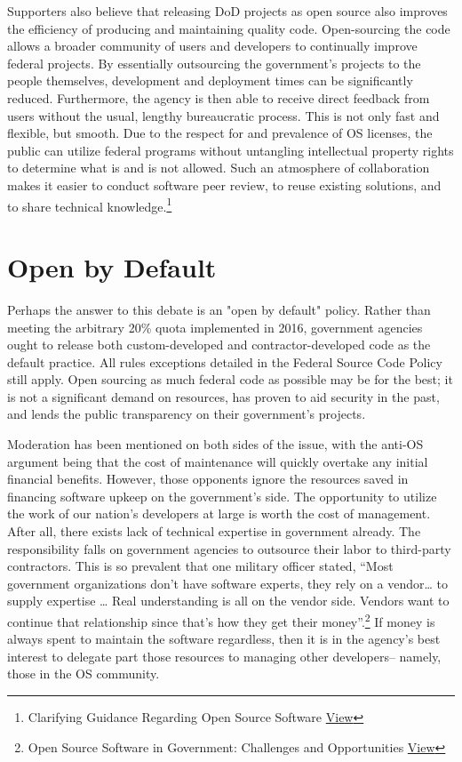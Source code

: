 \documentclass[a4paper]{article}
\begin{document}
	Supporters also believe that releasing DoD projects as open source also improves the efficiency of producing and maintaining quality code. Open-sourcing the code allows a broader community of users and developers to continually improve federal projects. By essentially outsourcing the government's projects to the people themselves, development and deployment times can be significantly reduced. Furthermore, the agency is then able to receive direct feedback from users without the usual, lengthy bureaucratic process. This is not only fast and flexible, but smooth. Due to the respect for and prevalence of OS licenses, the public can utilize federal programs without untangling intellectual property rights to determine what is and is not allowed. Such an atmosphere of collaboration makes it easier to conduct software peer review, to reuse existing solutions, and to share technical knowledge.\footnote{Clarifying Guidance Regarding Open Source Software \href{http://dodcio.defense.gov/Portals/0/Documents/OSSFAQ/2009OSS.pdf}{View}}


\section*{Open by Default}

\qquad Perhaps the answer to this debate is an "open by default" policy. Rather than meeting the arbitrary 20\% quota implemented in 2016, government agencies ought to release both custom-developed and contractor-developed code as the default practice. All rules exceptions detailed in the Federal Source Code Policy still apply. Open sourcing as much federal code as possible may be for the best; it is not a significant demand on resources, has proven to aid security in the past, and lends the public transparency on their government's projects.


Moderation has been mentioned on both sides of the issue, with the anti-OS argument being that the cost of maintenance will quickly overtake any initial financial benefits. However, those opponents ignore the resources saved in financing software upkeep on the government's side. The opportunity to utilize the work of our nation's developers at large is worth the cost of management. After all, there exists lack of technical expertise in government already. The responsibility falls on government agencies to outsource their labor to third-party contractors. This is so prevalent that one military officer stated, “Most government organizations don’t have software experts, they rely on a vendor… to supply expertise … Real understanding is all on the vendor side. Vendors want to continue that relationship since that’s how they get their money”.\footnote{Open Source Software in Government: Challenges and Opportunities \href{https://www.dhs.gov/sites/default/files/publications/Open\%20Source\%20Software\%20in\%20Government\%20\%E2\%80\%93\%20Challenges\%20and\%20Opportunities\_Final.pdf}{View}} If money is always spent to maintain the software regardless, then it is in the agency's best interest to delegate part those resources to managing other developers– namely, those in the OS community.
\end{document}
